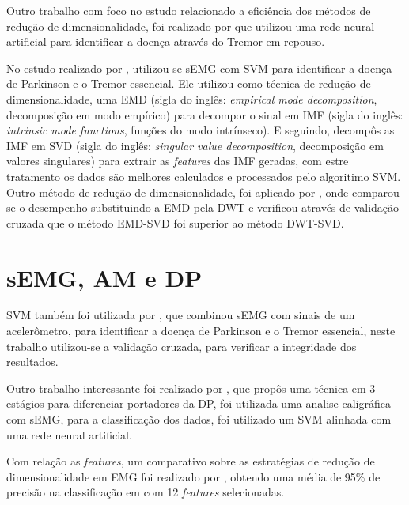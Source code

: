 Outro trabalho com foco no estudo relacionado a eficiência dos métodos de redução de dimensionalidade, foi realizado por  que utilizou uma rede neural artificial para identificar a doença através do Tremor em repouso. 

No estudo realizado por , utilizou-se sEMG com SVM para identificar a doença de Parkinson e o Tremor essencial. Ele utilizou como técnica de redução de dimensionalidade, uma EMD (sigla do inglês: \textit{empirical mode decomposition}, decomposição em modo empírico) para decompor o sinal em IMF (sigla do inglês: \textit{intrinsic mode functions}, funções do modo intrínseco). E seguindo, decompôs as IMF em SVD (sigla do inglês: \textit{singular value decomposition}, decomposição em valores singulares) para extrair as \textit{features} das IMF geradas, com estre tratamento os dados são melhores calculados e processados pelo algoritimo SVM. Outro método de redução de dimensionalidade, foi aplicado por , onde comparou-se o desempenho substituindo a EMD pela DWT e verificou através de validação cruzada que o método EMD-SVD foi superior ao método DWT-SVD.

\section{sEMG, AM e DP}
SVM também foi utilizada por \cite{kugler2013automated}, que combinou sEMG com sinais de um acelerômetro, para identificar a doença de Parkinson e o Tremor essencial, neste trabalho utilizou-se a validação cruzada, para verificar a integridade dos resultados.

Outro trabalho interessante foi realizado por \cite{loconsole2018model}, que propôs uma técnica em 3 estágios para diferenciar portadores da DP, foi utilizada uma analise caligráfica com sEMG, para a classificação dos dados, foi utilizado um SVM alinhada com uma rede neural artificial.

Com relação as \textit{features}, um comparativo sobre as estratégias de redução de dimensionalidade em EMG foi realizado por \cite{liu2014feature}, obtendo uma média de 95\% de precisão na classificação em com 12 \textit{features} selecionadas. 